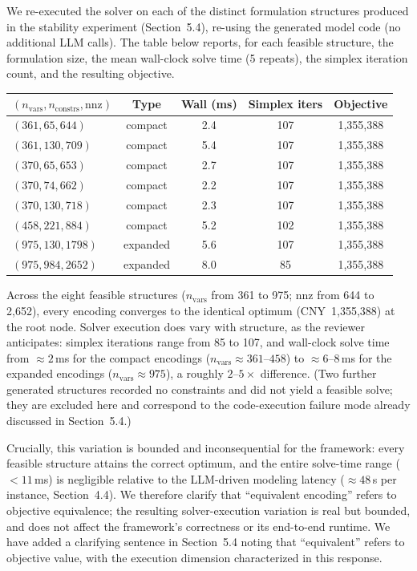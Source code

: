 \documentclass[11pt,a4paper]{article}
\begin{document}
We re-executed the solver on each of the distinct formulation structures produced in the stability experiment (Section~5.4), re-using the generated model code (no additional LLM calls). The table below reports, for each feasible structure, the formulation size, the mean wall-clock solve time (5 repeats), the simplex iteration count, and the resulting objective.

\begin{center}
\small
\begin{tabular}{lcccc}
\toprule
$(n_{\text{vars}}, n_{\text{constrs}}, \text{nnz})$ & Type & Wall (ms) & Simplex iters & Objective \\
\midrule
$(361, 65, 644)$   & compact  & 2.4  & 107 & 1{,}355{,}388 \\
$(361, 130, 709)$  & compact  & 5.4  & 107 & 1{,}355{,}388 \\
$(370, 65, 653)$   & compact  & 2.7  & 107 & 1{,}355{,}388 \\
$(370, 74, 662)$   & compact  & 2.2  & 107 & 1{,}355{,}388 \\
$(370, 130, 718)$  & compact  & 2.3  & 107 & 1{,}355{,}388 \\
$(458, 221, 884)$  & compact  & 5.2  & 102 & 1{,}355{,}388 \\
$(975, 130, 1798)$ & expanded & 5.6  & 107 & 1{,}355{,}388 \\
$(975, 984, 2652)$ & expanded & 8.0  & 85  & 1{,}355{,}388 \\
\bottomrule
\end{tabular}
\end{center}

Across the eight feasible structures ($n_{\text{vars}}$ from 361 to 975; nnz from 644 to 2{,}652), every encoding converges to the identical optimum (CNY~1{,}355{,}388) at the root node. Solver execution does vary with structure, as the reviewer anticipates: simplex iterations range from 85 to 107, and wall-clock solve time from ${\approx}2$\,ms for the compact encodings ($n_{\text{vars}}\!\approx\!361$--$458$) to ${\approx}6$--$8$\,ms for the expanded encodings ($n_{\text{vars}}\!\approx\!975$), a roughly $2$--$5\times$ difference. (Two further generated structures recorded no constraints and did not yield a feasible solve; they are excluded here and correspond to the code-execution failure mode already discussed in Section~5.4.)

Crucially, this variation is bounded and inconsequential for the framework: every feasible structure attains the correct optimum, and the entire solve-time range ($<\!11$\,ms) is negligible relative to the LLM-driven modeling latency (${\approx}48$\,s per instance, Section~4.4). We therefore clarify that ``equivalent encoding'' refers to objective equivalence; the resulting solver-execution variation is real but bounded, and does not affect the framework's correctness or its end-to-end runtime. We have added a clarifying sentence in Section~5.4 noting that ``equivalent'' refers to objective value, with the execution dimension characterized in this response.
\end{document}

